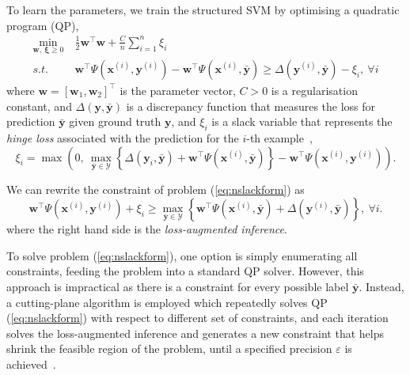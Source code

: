 \documentclass[9pt]{extarticle}
\begin{document}
To learn the parameters, we train the structured SVM by optimising a quadratic program (QP),
\begin{equation}
\label{eq:nslackform}
\begin{aligned}
\min_{\mathbf{w}, ~\bm{\xi} \ge 0} ~& \frac{1}{2} \mathbf{w}^\top \mathbf{w} + \frac{C}{n} \sum_{i=1}^n \xi_i \\
s.t.~~ ~& \mathbf{w}^\top \Psi(\mathbf{x}^{(i)}, \mathbf{y}^{(i)}) - \mathbf{w}^\top \Psi(\mathbf{x}^{(i)}, \bar{\mathbf{y}}) \ge 
       \Delta(\mathbf{y}^{(i)}, \bar{\mathbf{y}}) - \xi_i, ~\forall i
\end{aligned}
\end{equation}
where $\mathbf{w} = [\mathbf{w}_1, \mathbf{w}_2]^\top$ is the parameter vector, $C > 0$ is a regularisation constant, 
and $\Delta(\mathbf{y}, \bar{\mathbf{y}})$ is a discrepancy function that measures the loss 
for prediction $\bar{\mathbf{y}}$ given ground truth $\mathbf{y}$, and $\xi_i$
is a slack variable that represents the \emph{hinge loss} associated with the prediction for the $i$-th example~\cite{tsochantaridis2005large},
\begin{equation*}
\label{eq:nslackloss}
\xi_i = \max \left( 0,~ 
        \max_{\bar{\mathbf{y}} \in \mathcal{Y}} 
        \left\{ \Delta(\mathbf{y}_i, \bar{\mathbf{y}}) + \mathbf{w}^\top \Psi(\mathbf{x}^{(i)}, \bar{\mathbf{y}}) \right\} -
        \mathbf{w}^\top \Psi(\mathbf{x}^{(i)}, \mathbf{y}^{(i)}) \right).
\end{equation*}

We can rewrite the constraint of problem (\ref{eq:nslackform}) as
\begin{equation*}
\mathbf{w}^\top \Psi(\mathbf{x}^{(i)}, \mathbf{y}^{(i)}) + \xi_i \ge
          \max_{\bar{\mathbf{y}} \in \mathcal{Y}} 
          \left\{\mathbf{w}^\top \Psi(\mathbf{x}^{(i)}, \bar{\mathbf{y}}) + \Delta(\mathbf{y}^{(i)}, \bar{\mathbf{y}}) \right\},~ \forall i.
\end{equation*}
where the right hand side is the \emph{loss-augmented inference}.

To solve problem (\ref{eq:nslackform}), one option is simply enumerating all constraints, feeding the problem into a standard QP solver.
However, this approach is impractical as there is a constraint for every possible label $\bar{\mathbf{y}}$.
Instead, a cutting-plane algorithm is employed which repeatedly solves QP (\ref{eq:nslackform}) with respect to different set of constraints, 
and each iteration solves the loss-augmented inference and generates a new constraint that helps shrink the feasible region of the problem, 
until a specified precision $\varepsilon$ is achieved~\cite{joachims2009predicting}.
\end{document}
